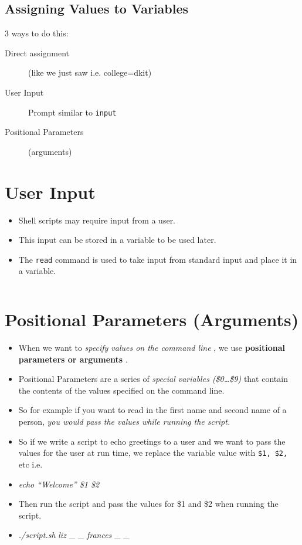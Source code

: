 \documentclass[slides]{pgnotes}
\begin{document}
\inputminted{bash}{usage.sh}


\subsection{Assigning Values to Variables}\label{assigning-values-to-variables}

3 ways to do this:

\begin{description}
\item[Direct assignment] (like we just saw i.e. college=dkit)
\item[User Input] Prompt similar to \texttt{input}
\item[Positional Parameters] (arguments)
\end{description}


\section{User Input}\label{user-input}

\begin{itemize}

\item
  Shell scripts may require input from a user.
\item This input can be stored in a variable to be used later.
\item The \texttt{read} command is used to take input from standard input and place it in a variable.
\end{itemize}

\inputminted{bash}{read_example.sh}


\section{Positional Parameters (Arguments)}\label{positional-parameters-arguments}

\begin{itemize}

\item
  When we want to \emph{specify values on the command line} , we use
  \textbf{positional parameters or arguments} .
\item
  Positional Parameters are a series of \emph{special variables
  (\$0\ldots{}\$9) } that contain the contents of the values specified
  on the command line.
\item
  So for example if you want to read in the first name and second name
  of a person, \emph{you would pass the values while running the
  script.}
\item
  So if we write a script to echo greetings to a user and we want to
  pass the values for the user at run time, we replace the variable
  value with \texttt{\$1, \$2,} etc i.e.
\item
  \emph{echo ``Welcome'' \$1 \$2}
\item
  Then run the script and pass the values for \$1 and \$2 when running
  the script.
\item
  \emph{./script.sh } \emph{liz} \_ \_ \emph{frances} \_ \_
\end{itemize}
\end{document}
